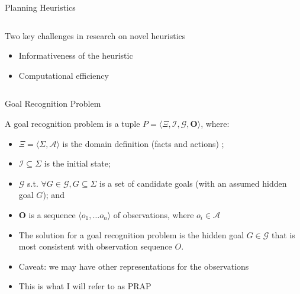 \documentclass[usenames,dvipsnames]{beamer}
\begin{document}
\begin{frame}[c]{Planning Heuristics}
\begin{columns}[t]
\begin{column}[t]{.55\textwidth}
			\vspace{2em}
			
			Two key challenges in research on novel heuristics
			\begin{itemize}
				\item Informativeness of the heuristic
				\item Computational efficiency
			\end{itemize}
%
		\end{column}
	\end{columns}
\end{frame}

\begin{frame}[c]{Goal Recognition Problem}
	\begin{definition}
		A goal recognition problem is a tuple $P = \langle \Xi, \mathcal{I}, \mathcal{G}, \mathbf{O} \rangle$, where:
   	\begin{itemize}
   		\item $\Xi = \langle \Sigma, \mathcal{A} \rangle$ is the domain definition (facts and actions) ;
   		\item $\mathcal{I} \subseteq \Sigma$ is the initial state;
   		\item $\mathcal{G}$ s.t. $\forall{G \in \mathcal{G}}, G \subseteq \Sigma$ is a set of candidate goals (with an assumed hidden goal $G$); and
   		\item $\mathbf{O}$ is a sequence $\langle o_1, \dots o_n \rangle$ of observations, where $o_i \in \mathcal{A}$
   	\end{itemize}
   	\end{definition}
    
    \begin{itemize}
    	\item The solution for a goal recognition problem is the hidden goal $G \in \mathcal{G}$ that is most consistent with observation sequence $O$.
    	\item Caveat: we may have other representations for the observations
    	\item This is what I will refer to as PRAP
    \end{itemize}
\end{frame}	
\end{document}
